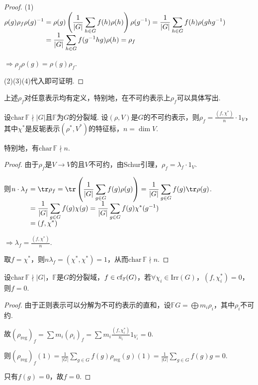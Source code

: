 \begin{proof}
    (1)$\setjot[-2]\begin{aligned}[t]
        \rho(g)\rho_f\rho(g)^{-1} &= \rho(g)\left(\frac{1}{|G|}\sum_{h\in G}f(h)\rho(h)\right)\rho(g^{-1})=\frac{1}{|G|}\sum_{h\in G}f(h)\rho(ghg^{-1})\\
        &=\frac{1}{|G|}\sum_{h\in G}f(g^{-1}hg)\rho(h)=\rho_f
    \end{aligned}$\par
    $\Rightarrow \rho_f\rho(g)=\rho(g)\rho_f$.\par
    (2)(3)(4)代入即可证明.
\end{proof}

上述$\rho_f$对任意表示均有定义，特别地，在不可约表示上$\rho_f$可以具体写出.

\begin{lemma}[]
    设$\mathrm{char}\,\mathbb{F}\nmid |G|$且$\mathbb{F}$为$G$的分裂域. 设$(\rho,V)$是$G$的不可约表示，则$\rho_f = \frac{(f,\chi^*)}{n}\cdot 1_V$，其中$\chi^*$是反轭表示$(\rho^*,V^*)$的特征标，$n=\dim V$.\par
    特别地，有$\mathrm{char}\,\mathbb{F}\nmid n$.
\end{lemma}

\begin{proof}
    由于$\rho_f$是$V\to V$的\ghomo 且$V$不可约，由Schur引理，$\rho_f = \lambda_f\cdot 1_V$.\par
    则$\setjot[-2]\begin{aligned}[t]
         n\cdot \lambda_f &= \tr\rho_f = \tr\left(\frac{1}{|G|}\sum_{g\in G}f(g)\rho(g)\right) = \frac{1}{|G|}\sum_{g\in G}f(g)\tr\rho(g) \\
         &= \frac{1}{|G|}\sum_{g\in G}f(g)\chi(g) = \frac{1}{|G|}\sum_{g\in G}f(g)\chi^*(g^{-1})\\ 
         &= (f,\chi^*)
    \end{aligned}$.\par
    $\Rightarrow \lambda_f = \frac{(f,\chi^*)}{n}$.\par
    取$f=\chi^*$，则$n\lambda_f = (\chi^*,\chi^*) = 1$，从而$\mathrm{char}\,\mathbb{F}\nmid n$.
\end{proof}

\begin{lemma}[]
    设$\mathrm{char}\,\mathbb{F}\nmid |G|$，$\mathbb{F}$是$G$的分裂域，$f\in \operatorname{cf}_{\mathbb{F}}(G)$，若$\forall \chi_i \in \mathrm{Irr}(G)$，$(f,\chi_i^*)=0$，则$f=0$.
\end{lemma}

\begin{proof}
    由于正则表示可以分解为不可约表示的直和，设$\mathbb{F}G = \bigoplus m_i\rho_i$，其中$\rho_i$不可约.\par
    故$(\rho_{\mathrm{reg}})_f = \sum m_i(\rho_i)_f = \sum m_i\frac{(f,\chi_i^*)}{n_i}1_{V_i} = 0$.\par
    则$(\rho_{\mathrm{reg}})_f(1) = \frac{1}{|G|}\sum_{g\in G}f(g)\rho_{\mathrm{reg}}(g)(1) = \frac{1}{|G|}\sum_{g\in G}f(g)g = 0$.\par
    只有$f(g)=0$，故$f=0$.
\end{proof}

